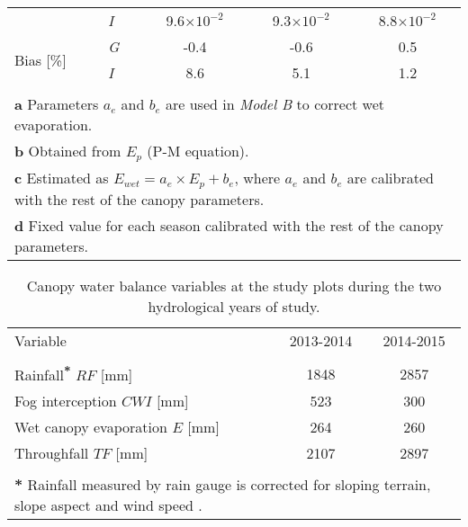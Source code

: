 \documentclass[a4paper,12pt]{article}
\begin{document}
\begin{table}[H]
{\begin{tabular}{llccc}
			&\textit{I}&9.6$\times 10^{-2}$&9.3$\times 10^{-2}$&8.8$\times 10^{-2}$\\
			\multirow{2}{*}{Bias [\%]}	&\textit{G}&-0.4&-0.6&0.5\\
			&\textit{I}&8.6&5.1&1.2\\		
			\hhline{-----}\\	
			[-8pt]		             
			\multicolumn{5}{l}{\tiny \textcolor{Blue4}{\bf {\tiny{a}}} Parameters $a_e$ and $b_e$ are used in \textit{Model B} to correct wet evaporation.}\\
			[-4pt]		             
			\multicolumn{5}{l}{\tiny \textcolor{Blue4}{\bf {\tiny{b}}} Obtained from $E_p$ (P-M equation).}\\
			[-4pt]		             
			\multicolumn{5}{l}{\tiny \textcolor{Blue4}{\bf {\tiny{c}}} Estimated as $E_{wet}=a_e \times E_p + b_e$, where $a_e$ and $b_e$ are calibrated with the rest of the canopy parameters.}\\
			[-4pt]		             
			\multicolumn{5}{l}{\tiny \textcolor{Blue4}{\bf {\tiny{d}}} Fixed value for each season calibrated with the rest of the canopy parameters.}
            \end{tabular}
            }
            \end{table}

\begin{table}[H]
           \caption[Canopy water balance variables at the study plots during the two hydrological years of study]{Canopy water balance variables at the study plots during the two hydrological years of study.} \label{tb:fog_wb}
           \centering
           \footnotesize
            \colorbox{gray!15} {
\centering
            \begin{tabular}{lccc}
            Variable&&2013-2014&2014-2015\\ 
            \hhline{----} \\[-8pt]
			Rainfall\textsuperscript{\textcolor{Blue4}{\bf {\tiny{*}}}} $RF$ [mm]&&1848&2857\\
			Fog interception $CWI$ [mm]&&523&300\\			
			Wet canopy evaporation $E$ [mm]&&264&260\\
			Throughfall $TF$ [mm]&&2107&2897\\
			\hhline{----}\\	
			[-8pt]		             
			\multicolumn{4}{l}{\tiny \textcolor{Blue4}{\bf {\tiny{*}}} Rainfall measured by rain gauge is corrected for sloping terrain, slope aspect and wind speed \citep{Sharon1980}.}\\
            \end{tabular}
            }
            \end{table}
\end{document}
